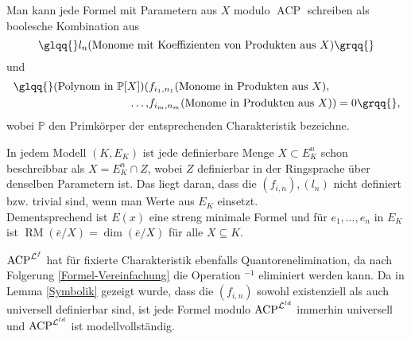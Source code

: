     \begin{corollary}\label{Formel-Vereinfachung}
    	Man kann jede Formel mit Parametern aus $X$ modulo $\operatorname{ACP}$ schreiben als boolesche Kombination aus $$\glqq{}l_n(\text{Monome mit Koeffizienten von Produkten aus }X)\grqq{}$$ und
    	\begin{align*}
    	\text{\glqq{}}(\text{Polynom in }\mathbb{P}[X])(&f_{i_1,n_1}(\text{Monome in Produkten aus }X),\\\dots,&f_{i_m,n_m}(\text{Monome in Produkten aus }X))=0\grqq{},
    	\end{align*}
        wobei $\mathbb{P}$ den Primkörper der entsprechenden Charakteristik bezeichne.
    \end{corollary}
    \begin{corollary}
    	In jedem Modell $(K,E_K)$ ist jede definierbare Menge $X\subset E_K^n$ schon beschreibbar als $X=E_K^n\cap Z$, wobei $Z$ definierbar in der Ringsprache über denselben Parametern ist. Das liegt daran, dass die $(f_{i,n}),(l_n)$ nicht definiert bzw. trivial sind, wenn man Werte aus $E_K$ einsetzt.\\ Dementsprechend ist $E(x)$ eine streng minimale Formel und für $e_1,\dots,e_n$ in $E_K$ ist $\operatorname{RM}(\overline{e}/X)=\dim(\overline{e}/X)$ für alle $X\subseteq K$.
    \end{corollary}
    \begin{corollary}
    	$\operatorname{ACP}^{\mathcal{L}^f}$ hat für fixierte Charakteristik ebenfalls Quantorenelimination, da nach Folgerung \ref{Formel-Vereinfachung} die Operation \glqq{}$^{-1}$\grqq{} eliminiert werden kann. Da in Lemma \ref{Symbolik} gezeigt wurde, dass die $(f_{i,n})$ sowohl existenziell als auch universell definierbar sind, ist jede Formel modulo $\operatorname{ACP}^{\mathcal{L}^{ld}}$ immerhin universell und $\operatorname{ACP}^{\mathcal{L}^{ld}}$ ist modellvollständig.
    \end{corollary}
    
